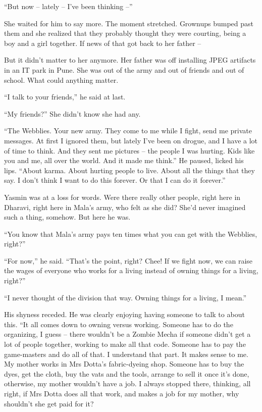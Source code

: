 ``But now -- lately -- I've been thinking --''

She waited for him to say more. The moment stretched. Grownups
bumped past them and she realized that they probably thought they
were courting, being a boy and a girl together. If news of that got
back to her father --

But it didn't matter to her anymore. Her father was off installing
JPEG artifacts in an IT park in Pune. She was out of the army and
out of friends and out of school. What could anything matter.

``I talk to your friends,'' he said at last.

``My friends?'' She didn't know she had any.

``The Webblies. Your new army. They come to me while I fight, send
me private messages. At first I ignored them, but lately I've been
on drogue, and I have a lot of time to think. And they sent me
pictures -- the people I was hurting. Kids like you and me, all
over the world. And it made me think.'' He paused, licked his lips.
``About karma. About hurting people to live. About all the things
that they say. I don't think I want to do this forever. Or that I
can do it forever.''

Yasmin was at a loss for words. Were there really other people,
right here in Dharavi, right here in Mala's army, who felt as she
did? She'd never imagined such a thing, somehow. But here he was.

``You know that Mala's army pays ten times what you can get with the
Webblies, right?''

``For now,'' he said. ``That's the point, right? Chee! If we fight
now, we can raise the wages of everyone who works for a living
instead of owning things for a living, right?''

``I never thought of the division that way. Owning things for a
living, I mean.''

His shyness receded. He was clearly enjoying having someone to talk
to about this. ``It all comes down to owning versus working. Someone
has to do the organizing, I guess -- there wouldn't be a Zombie
Mecha if someone didn't get a lot of people together, working to
make all that code. Someone has to pay the game-masters and do all
of that. I understand that part. It makes sense to me. My mother
works in Mrs Dotta's fabric-dyeing shop. Someone has to buy the
dyes, get the cloth, buy the vats and the tools, arrange to sell it
once it's done, otherwise, my mother wouldn't have a job. I always
stopped there, thinking, all right, if Mrs Dotta does all that
work, and makes a job for my mother, why shouldn't she get paid for
it?

